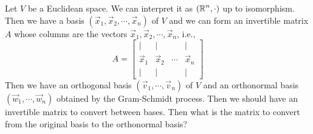 Let $V$ be a Euclidean space. We can interpret it as $(\operatorname{\mathbb{R}}^n, \cdot)$ up to isomorphism. Then we have a basis $(\vec{x}_1, \vec{x}_2, \cdots, \vec{x}_n)$ of $V$ and we can form an invertible matrix $A$ whose columns are the vectors $\vec{x}_1, \vec{x}_2, \cdots, \vec{x}_n$, i.e.,
\[
	A = \begin{bmatrix}
		|         & |         &        & |         \\
		\vec{x}_1 & \vec{x}_2 & \cdots & \vec{x}_n \\
		|         & |         &        & |
	\end{bmatrix}
\]
Then we have an orthogonal basis $(\vec{v}_1, \cdots, \vec{v}_n)$ of $V$ and an orthonormal basis $(\vec{w}_1, \cdots, \vec{w}_n)$ obtained by the Gram-Schmidt process. Then we should have an invertible matrix to convert between bases. Then what is the matrix to convert from the original basis to the orthonormal basis?


